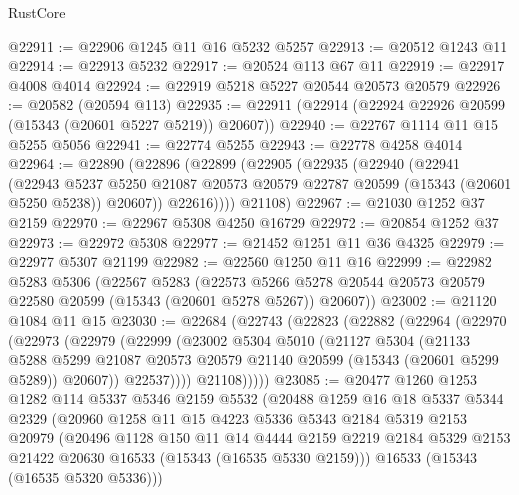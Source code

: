 \begin{lexlean}{RustCore}
\begin{coremodule}
@22911 := @22906 @1245 @11 @16 @5232 @5257
@22913 := @20512 @1243 @11
@22914 := @22913 @5232
@22917 := @20524 @113 @67 @11
@22919 := @22917 @4008 @4014
@22924 := @22919 @5218 @5227 @20544 @20573 @20579
@22926 := @20582 (@20594 @113)
@22935 := @22911 (@22914 (@22924 @22926 @20599 (@15343 (@20601 @5227 @5219)) @20607))
@22940 := @22767 @1114 @11 @15 @5255 @5056
@22941 := @22774 @5255
@22943 := @22778 @4258 @4014
@22964 := @22890
    (@22896
      (@22899
        (@22905
          (@22935
            (@22940
              (@22941
                (@22943
                  @5237
                  @5250
                  @21087
                  @20573
                  @20579
                  @22787
                  @20599
                  (@15343 (@20601 @5250 @5238))
                  @20607))
              @22616))))
      @21108)
@22967 := @21030 @1252 @37 @2159
@22970 := @22967 @5308 @4250 @16729
@22972 := @20854 @1252 @37
@22973 := @22972 @5308
@22977 := @21452 @1251 @11 @36 @4325
@22979 := @22977 @5307 @21199
@22982 := @22560 @1250 @11 @16
@22999 := @22982
    @5283
    @5306
    (@22567
      @5283
      (@22573 @5266 @5278 @20544 @20573 @20579 @22580 @20599 (@15343 (@20601 @5278 @5267)) @20607))
@23002 := @21120 @1084 @11 @15
@23030 := @22684
    (@22743
      (@22823
        (@22882
          (@22964
            (@22970
              (@22973
                (@22979
                  (@22999
                    (@23002
                      @5304
                      @5010
                      (@21127
                        @5304
                        (@21133
                          @5288
                          @5299
                          @21087
                          @20573
                          @20579
                          @21140
                          @20599
                          (@15343 (@20601 @5299 @5289))
                          @20607))
                      @22537))))
              @21108)))))
@23085 := @20477
    @1260
    @1253
    @1282
    @114
    @5337
    @5346
    @2159
    @5532
    (@20488
      @1259
      @16
      @18
      @5337
      @5344
      @2329
      (@20960
        @1258
        @11
        @15
        @4223
        @5336
        @5343
        @2184
        @5319
        @2153
        @20979
        (@20496
          @1128
          @150
          @11
          @14
          @4444
          @2159
          @2219
          @2184
          @5329
          @2153
          @21422
          @20630
          @16533
          (@15343 (@16535 @5330 @2159)))
        @16533
        (@15343 (@16535 @5320 @5336)))

\end{coremodule}
\end{lexlean}
